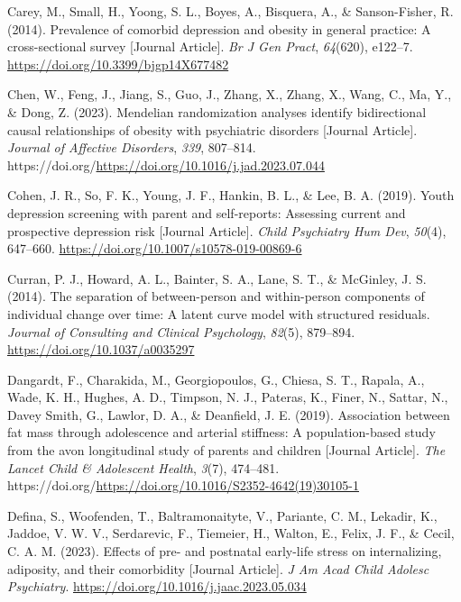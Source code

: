 \documentclass[
  letterpaper,
  DIV=11,
  numbers=noendperiod]{scrreport}
\newlength{\cslhangindent}
\newenvironment{CSLReferences}[2] %
 {\begin{list}{}{%
  \setlength{\itemindent}{0pt}
  \setlength{\leftmargin}{0pt}
  \setlength{\parsep}{0pt}
  \ifodd #1
   \setlength{\leftmargin}{\cslhangindent}
   \setlength{\itemindent}{-1\cslhangindent}
  \fi
  \setlength{\itemsep}{#2\baselineskip}}}
 {\end{list}}
\begin{document}
\begin{CSLReferences}{1}{0}
Carey, M., Small, H., Yoong, S. L., Boyes, A., Bisquera, A., \&
Sanson-Fisher, R. (2014). Prevalence of comorbid depression and obesity
in general practice: A cross-sectional survey {[}Journal Article{]}.
\emph{Br J Gen Pract}, \emph{64}(620), e122--7.
\url{https://doi.org/10.3399/bjgp14X677482}

Chen, W., Feng, J., Jiang, S., Guo, J., Zhang, X., Zhang, X., Wang, C.,
Ma, Y., \& Dong, Z. (2023). Mendelian randomization analyses identify
bidirectional causal relationships of obesity with psychiatric disorders
{[}Journal Article{]}. \emph{Journal of Affective Disorders},
\emph{339}, 807--814.
https://doi.org/\url{https://doi.org/10.1016/j.jad.2023.07.044}

Cohen, J. R., So, F. K., Young, J. F., Hankin, B. L., \& Lee, B. A.
(2019). Youth depression screening with parent and self-reports:
Assessing current and prospective depression risk {[}Journal Article{]}.
\emph{Child Psychiatry Hum Dev}, \emph{50}(4), 647--660.
\url{https://doi.org/10.1007/s10578-019-00869-6}

Curran, P. J., Howard, A. L., Bainter, S. A., Lane, S. T., \& McGinley,
J. S. (2014). The separation of between-person and within-person
components of individual change over time: A latent curve model with
structured residuals. \emph{Journal of Consulting and Clinical
Psychology}, \emph{82}(5), 879--894.
\url{https://doi.org/10.1037/a0035297}

Dangardt, F., Charakida, M., Georgiopoulos, G., Chiesa, S. T., Rapala,
A., Wade, K. H., Hughes, A. D., Timpson, N. J., Pateras, K., Finer, N.,
Sattar, N., Davey Smith, G., Lawlor, D. A., \& Deanfield, J. E. (2019).
Association between fat mass through adolescence and arterial stiffness:
A population-based study from the avon longitudinal study of parents and
children {[}Journal Article{]}. \emph{The Lancet Child \& Adolescent
Health}, \emph{3}(7), 474--481.
https://doi.org/\url{https://doi.org/10.1016/S2352-4642(19)30105-1}

Defina, S., Woofenden, T., Baltramonaityte, V., Pariante, C. M.,
Lekadir, K., Jaddoe, V. W. V., Serdarevic, F., Tiemeier, H., Walton, E.,
Felix, J. F., \& Cecil, C. A. M. (2023). Effects of pre- and postnatal
early-life stress on internalizing, adiposity, and their comorbidity
{[}Journal Article{]}. \emph{J Am Acad Child Adolesc Psychiatry}.
\url{https://doi.org/10.1016/j.jaac.2023.05.034}


\end{CSLReferences}
\end{document}
